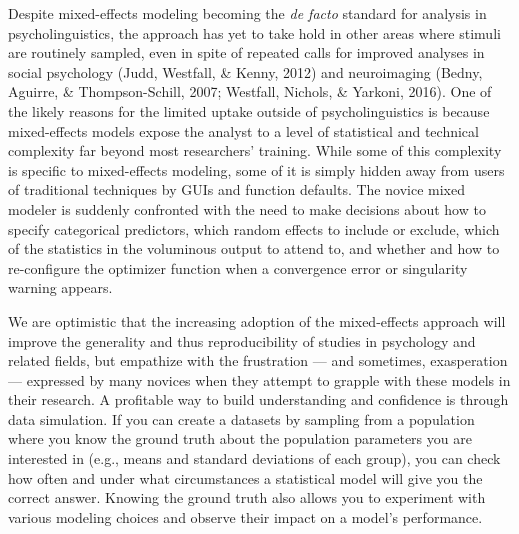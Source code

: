 \documentclass[english,doc,floatsintext]{apa6}
\begin{document}
Despite mixed-effects modeling becoming the \emph{de facto} standard for analysis in psycholinguistics, the approach has yet to take hold in other areas where stimuli are routinely sampled, even in spite of repeated calls for improved analyses in social psychology (Judd, Westfall, \& Kenny, 2012) and neuroimaging (Bedny, Aguirre, \& Thompson-Schill, 2007; Westfall, Nichols, \& Yarkoni, 2016). One of the likely reasons for the limited uptake outside of psycholinguistics is because mixed-effects models expose the analyst to a level of statistical and technical complexity far beyond most researchers' training. While some of this complexity is specific to mixed-effects modeling, some of it is simply hidden away from users of traditional techniques by GUIs and function defaults. The novice mixed modeler is suddenly confronted with the need to make decisions about how to specify categorical predictors, which random effects to include or exclude, which of the statistics in the voluminous output to attend to, and whether and how to re-configure the optimizer function when a convergence error or singularity warning appears.

We are optimistic that the increasing adoption of the mixed-effects approach will improve the generality and thus reproducibility of studies in psychology and related fields, but empathize with the frustration --- and sometimes, exasperation --- expressed by many novices when they attempt to grapple with these models in their research. A profitable way to build understanding and confidence is through data simulation. If you can create a datasets by sampling from a population where you know the ground truth about the population parameters you are interested in (e.g., means and standard deviations of each group), you can check how often and under what circumstances a statistical model will give you the correct answer. Knowing the ground truth also allows you to experiment with various modeling choices and observe their impact on a model's performance.
\end{document}
